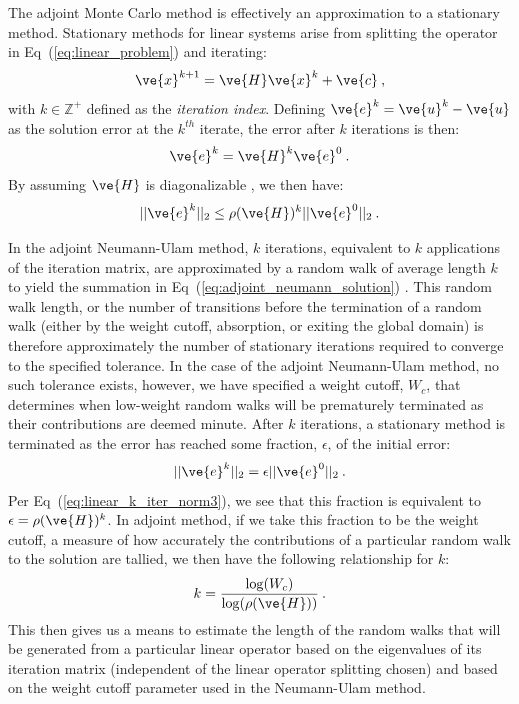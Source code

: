 \documentclass[preprint,11pt]{elsarticle}
\begin{document}
The adjoint Monte Carlo method is effectively an approximation to a
stationary method. Stationary methods for linear systems arise from
splitting the operator in Eq~(\ref{eq:linear_problem}) and iterating:
\begin{equation}
  \ve{x}^{k+1} = \ve{H}\ve{x}^k + \ve{c}\:,
  \label{eq:linear_iterative_method}
\end{equation}
with $k \in \mathbb{Z}^+$ defined as the \textit{iteration
  index}. Defining $\ve{e}^k = \ve{u}^k - \ve{u}$ as the solution
error at the $k^{th}$ iterate, the error after $k$ iterations is then:
\begin{equation}
  \ve{e}^{k} = \ve{H}^k\ve{e}^0\:. 
  \label{eq:linear_k_iter_error}
\end{equation}
By assuming $\ve{H}$ is diagonalizable \cite{leveque_finite_2007}, we
then have:
\begin{equation}
  ||\ve{e}^{k}||_2 \leq \rho(\ve{H})^k ||\ve{e}^0||_2\:.
  \label{eq:linear_k_iter_norm3}
\end{equation}

In the adjoint Neumann-Ulam method, $k$ iterations, equivalent to $k$
applications of the iteration matrix, are approximated by a random walk of
average length $k$ to yield the summation in
Eq~(\ref{eq:adjoint_neumann_solution})
\cite{dimov_new_1998,danilov_asymptotic_2000}. This random walk length, or the
number of transitions before the termination of a random walk (either by the
weight cutoff, absorption, or exiting the global domain) is therefore
approximately the number of stationary iterations required to converge to the
specified tolerance. In the case of the adjoint Neumann-Ulam method, no such
tolerance exists, however, we have specified a weight cutoff, $W_c$, that
determines when low-weight random walks will be prematurely terminated as
their contributions are deemed minute. After $k$ iterations, a stationary
method is terminated as the error has reached some fraction, $\epsilon$, of
the initial error:
\begin{equation}
  ||\ve{e}^{k}||_2 = \epsilon ||\ve{e}^0||_2\:.
  \label{eq:linear_k_iter_norm4}
\end{equation}
Per Eq~(\ref{eq:linear_k_iter_norm3}), we see that this fraction is equivalent
to $\epsilon = \rho(\ve{H})^k$. In adjoint method, if we take this fraction to
be the weight cutoff, a measure of how accurately the contributions of a
particular random walk to the solution are tallied, we then have the following
relationship for $k$:
\begin{equation}
  k = \frac{ \log(W_c) }{ \log( \rho(\ve{H}) ) }\:.
  \label{eq:analytic_k}
\end{equation}
This then gives us a means to estimate the length of the random walks
that will be generated from a particular linear operator based on the
eigenvalues of its iteration matrix (independent of the linear
operator splitting chosen) and based on the weight cutoff parameter
used in the Neumann-Ulam method.
\end{document}
